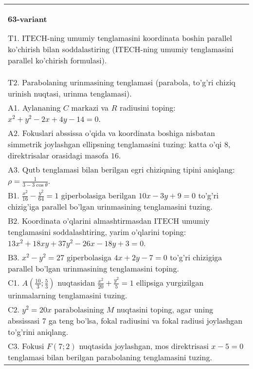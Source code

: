 \documentclass{article}
\begin{document}
\begin{tabular}{m{17cm}}
\textbf{63-variant}
\newline

T1. ITECH-ning umumiy tenglamasini koordinata boshin parallel ko'chirish bilan soddalastiring (ITECH-ning umumiy tenglamasini parallel ko'chirish formulasi).\\

T2. Parabolaning urinmasining tenglamasi (parabola, to'g'ri chiziq urinish nuqtasi, urinma tenglamasi).\\

A1. Aylananing $C$ markazi va $R$ radiusini toping: $x^2+y^2-2x+4y-14=0$.\\

A2. Fokuslari abssissa o'qida va koordinata boshiga nisbatan simmetrik joylashgan ellipsning tenglamasini tuzing: katta o'qi $8$, direktrisalar orasidagi masofa $16$.\\

A3. Qutb tenglamasi bilan berilgan egri chiziqning tipini aniqlang: $\rho=\frac{1}{3-3\cos\theta}$.\\

B1. $\frac{x^{2}}{16} - \frac{y^{2}}{64} = 1$ giperbolasiga berilgan $10x - 3y + 9 = 0$ to'g'ri chizig'iga parallel bo'lgan urinmasining tenglamasini tuzing.  \\

B2. Koordinata o'qlarini almashtirmasdan ITECH umumiy tenglamasini soddalashtiring, yarim o'qlarini toping: $13x^{2} + 18xy + 37y^{2} - 26x - 18y + 3 = 0$.  \\

B3. $x^{2} - y^{2} = 27$ giperbolasiga $4x + 2y - 7 = 0$ to'g'ri chizigiga parallel bo'lgan urinmasining tenglamasini toping.  \\

C1. $A(\frac{10}{3};\frac{5}{3})$ nuqtasidan $\frac{x^{2}}{20} + \frac{y^{2}}{5} = 1$ ellipsiga yurgizilgan urinmalarning tenglamasini tuzing.  \\

C2. $y^{2} = 20x$ parabolasining $M$ nuqtasini toping, agar uning abssissasi 7 ga teng bo'lsa, fokal radiusini va fokal radiusi joylashgan to'g'rini aniqlang.\\

C3. Fokusi $F(7;2)$ nuqtasida joylashgan, mos direktrisasi $x - 5 = 0$ tenglamasi bilan berilgan parabolaning tenglamasini tuzing.  \\

\end{tabular}
\vspace{1cm}
\end{document}
